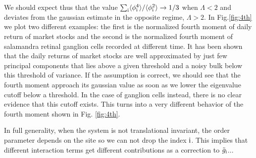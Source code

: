\documentclass[aps,twocolumn,floats,nofootinbib,prl]{revtex4}
\begin{document}
We should expect thus that the value $\sum_{\rm i}\langle \phi_{\rm i}^4\rangle /\langle \phi_{\rm i}^2\rangle \to 1/3$ when $\Lambda<2$ and deviates from the gaussian estimate in the opposite regime, $\Lambda>2$. In Fig.\ref{fig:4th} we plot two different examples: the first is the normalized fourth moment of daily return of market stocks and the second is the normalized fourth moment of salamandra retinal ganglion cells recorded at different time. It has been shown that the daily returns of market stocks are well approximated by just few principal components that lies above a given threshold and a noisy bulk below this threshold of variance. If the assumption is correct, we should see that the fourth moment approach its gaussian value as soon as we lower the eigenvalue cutoff below a threshold. In the case of ganglion cells instead, there is no clear evidence that this cutoff exists. This turns into a very different behavior of the fourth moment shown in Fig. \ref{fig:4th}.

In full generality, when the system is not translational invariant, the order parameter depends on the site so we can not drop the index ${\rm i}$. This implies that different interaction terms get different contributions as a correction to $\tilde g_{\rm i}$...


\end{document}
